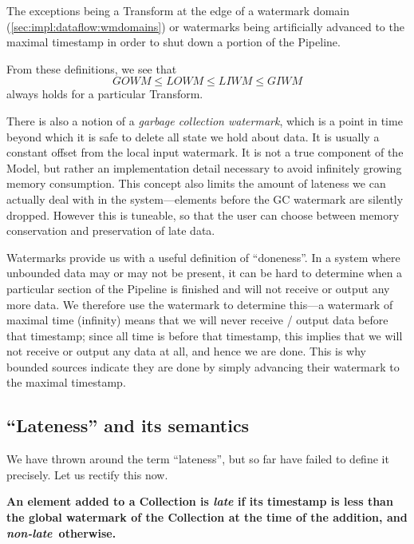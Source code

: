 \footnotetext
{
The exceptions being a Transform at the edge of a watermark domain (\cref{sec:impl:dataflow:wmdomains}) or watermarks being artificially advanced to the maximal timestamp in order to shut down a portion of the Pipeline.
} 


From these definitions, we see that \[ \mathit{GOWM} \leq \mathit{LOWM} \leq \mathit{LIWM} \leq \mathit{GIWM} \] always holds for a particular Transform.

There is also a notion of a \emph{garbage collection watermark}, which is a point in time beyond which it is safe to delete all state we hold about data.
It is usually a constant offset from the local input watermark.
It is not a true component of the Model, but rather an implementation detail necessary to avoid infinitely growing memory consumption.
This concept also limits the amount of lateness we can actually deal with in the system---elements before the GC watermark are silently dropped.
However this is tuneable, so that the user can choose between memory conservation and preservation of late data.

Watermarks provide us with a useful definition of ``doneness''.
In a system where unbounded data may or may not be present, it can be hard to determine when a particular section of the Pipeline is finished and will not receive or output any more data.
We therefore use the watermark to determine this---a watermark of maximal time (infinity) means that we will never receive / output data before that timestamp; since all time is before that timestamp, this implies that we will not receive or output any data at all, and hence we are done.
This is why bounded sources indicate they are done by simply advancing their watermark to the maximal timestamp.

\subsection{``Lateness'' and its semantics}\label{sec:impl:dataflow:lateness}

We have thrown around the term ``lateness'', but so far have failed to define it precisely.
Let us rectify this now.


\textbf{An element added to a Collection is \emph{late} if its timestamp is less than the global watermark of the Collection at the time of the addition, and \emph{non-late}\footnotemark\ otherwise.}

